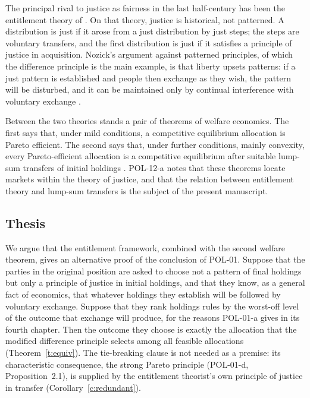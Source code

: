 \documentclass{situationist-preprint}
\begin{document}
The principal rival to justice as fairness in the last half-century has been the entitlement theory of \citet{Nozick1974}. On that theory, justice is historical, not patterned. A distribution is just if it arose from a just distribution by just steps; the steps are voluntary transfers, and the first distribution is just if it satisfies a principle of justice in acquisition. Nozick's argument against patterned principles, of which the difference principle is the main example, is that liberty upsets patterns: if a just pattern is established and people then exchange as they wish, the pattern will be disturbed, and it can be maintained only by continual interference with voluntary exchange \citep[ch.~7]{Nozick1974}.

Between the two theories stands a pair of theorems of welfare economics. The first says that, under mild conditions, a competitive equilibrium allocation is Pareto efficient. The second says that, under further conditions, mainly convexity, every Pareto-efficient allocation is a competitive equilibrium after suitable lump-sum transfers of initial holdings \citep{Arrow1951,Debreu1959}. POL-12-a notes that these theorems locate markets within the theory of justice, and that the relation between entitlement theory and lump-sum transfers is the subject of the present manuscript.

\subsection{Thesis}

We argue that the entitlement framework, combined with the second welfare theorem, gives an alternative proof of the conclusion of POL-01. Suppose that the parties in the original position are asked to choose not a pattern of final holdings but only a principle of justice in initial holdings, and that they know, as a general fact of economics, that whatever holdings they establish will be followed by voluntary exchange. Suppose that they rank holdings rules by the worst-off level of the outcome that exchange will produce, for the reasons POL-01-a gives in its fourth chapter. Then the outcome they choose is exactly the allocation that the modified difference principle selects among all feasible allocations (Theorem~\ref{t:equiv}). The tie-breaking clause is not needed as a premise: its characteristic consequence, the strong Pareto principle (POL-01-d, Proposition~2.1), is supplied by the entitlement theorist's own principle of justice in transfer (Corollary~\ref{c:redundant}).
\end{document}
